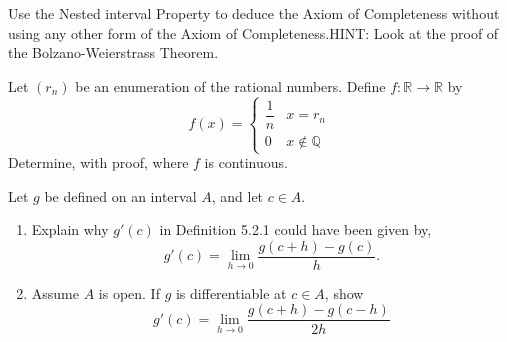 \documentclass[12pt]{article}
\makeatletter
\theoremstyle{homework}
\newenvironment{exercise}[1]
{\def\@currentlabel{#1}\exercisecore}
{\endexercisecore}
\newcommand{\Reals}{\ensuremath{\mathbb R}}
\newcommand{\Rats}{\ensuremath{\mathbb Q}}
\makeatother
\begin{document}
\begin{exercise}{6} Use the Nested interval Property to deduce the Axiom of Completeness without using any other form of the Axiom of
  Completeness.HINT: Look at the proof of the Bolzano-Weierstrass Theorem.\\
  
\end{exercise}
\vspace{.5in}


\begin{exercise}{7} Let $(r_n)$ be an enumeration of the rational numbers. Define $f: \Reals \to \Reals$ by 
  \begin{equation*}
    f(x) = 
    \begin{cases} 
      \dfrac{1}{n} & x = r_n \\
      0 & x \not\in \Rats 
   \end{cases}
  \end{equation*}
  Determine, with proof, where $f$ is continuous.\\
\end{exercise}
\vspace{.5in}

\begin{exercise}{8} Let $g$ be defined on an interval $A$, and let $c \in A.$\\
  \begin{enumerate}
    \item Explain why $g'(c)$ in Definition 5.2.1 could have been given by,
    \begin{equation*}
      g'(c) = \lim_{h \to 0} \dfrac{g(c+h) - g(c)}{h}.
    \end{equation*}


    \item  Assume $A$ is open. If $g$ is differentiable at $c \in A$, show
    \begin{equation*}
      g'(c) = \lim_{h \to 0} \dfrac{g(c+h) - g(c - h)}{2h}
    \end{equation*}
  \end{enumerate}
  
\end{exercise}
\vspace{.5in}
\end{document}
